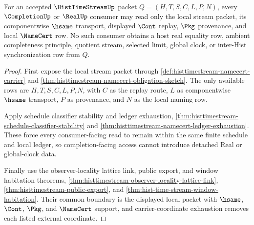 \begin{theorem}
\label{thm:histtimestream-real-completion-consumer-boundary}
For an accepted $\HistTimeStreamUp$ packet $Q=(H,T,S,C,L,P,N)$, every $\CompletionUp$ or $\RealUp$ consumer may read only the local stream packet, its componentwise $\hsame$ transport, displayed $\Cont$ replay, $\Pkg$ provenance, and local $\NameCert$ row. No such consumer obtains a host real equality row, ambient completeness principle, quotient stream, selected limit, global clock, or inter-Hist synchronization row from $Q$.
\end{theorem}
\begin{proof}
First expose the local stream packet through \autoref{def:histtimestream-namecert-carrier} and \autoref{thm:histtimestream-namecert-obligation-sketch}. The only available rows are $H,T,S,C,L,P,N$, with $C$ as the replay route, $L$ as componentwise $\hsame$ transport, $P$ as provenance, and $N$ as the local naming row.

Apply schedule classifier stability and ledger exhaustion, \autoref{thm:histtimestream-schedule-classifier-stability} and \autoref{thm:histtimestream-namecert-ledger-exhaustion}. These force every consumer-facing read to remain within the same finite schedule and local ledger, so completion-facing access cannot introduce detached Real or global-clock data.

Finally use the observer-locality lattice link, public export, and window habitation theorems, \autoref{thm:histtimestream-observer-locality-lattice-link}, \autoref{thm:histtimestream-public-export}, and \autoref{thm:hist-time-stream-window-habitation}. Their common boundary is the displayed local packet with $\hsame$, $\Cont$, $\Pkg$, and $\NameCert$ support, and carrier-coordinate exhaustion removes each listed external coordinate.
\end{proof}

